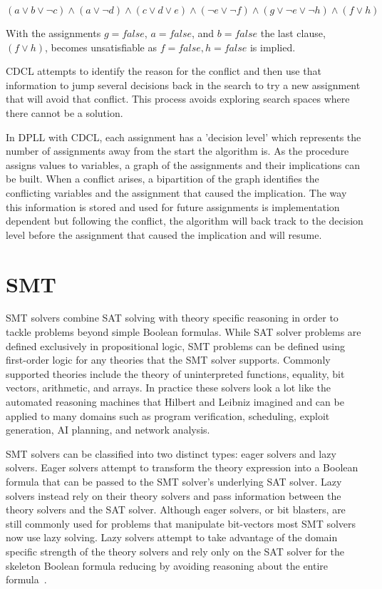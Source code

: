 \documentclass[]{final_report}
\begin{document}
$(a \lor b \lor \lnot c) \land (a \lor \lnot d) \land (c \lor d \lor e) \land (\lnot e \lor \lnot f ) \land (g \lor \lnot e \lor \lnot h) \land (f \lor h)$

With the assignments $g = \mathit{false}$, $a = \mathit{false}$, and $b = \mathit{false}$ the last clause, $ (f \lor h) $,  becomes unsatisfiable as $ f = \mathit{false}, h = \mathit{false}$ is implied.

CDCL attempts to identify the reason for the conflict and then use that information to jump several decisions back in the search to try a new assignment that will avoid that conflict. This process avoids exploring search spaces where there cannot be a solution. 

In DPLL with CDCL, each assignment has a 'decision level' which represents the number of assignments away from the start the algorithm is. As the procedure assigns values to variables, a graph of the assignments and their implications can be built. When a conflict arises, a bipartition of the graph identifies the conflicting variables and the assignment that caused the implication. The way this information is stored and used for future assignments is implementation dependent but following the conflict, the algorithm will back track to the decision level before the assignment that caused the implication and will resume.

\section{SMT}

SMT solvers combine SAT solving with theory specific reasoning in order to tackle problems beyond simple Boolean formulas. While SAT solver problems are defined exclusively in propositional logic, SMT problems can be defined using first-order logic for any theories that the SMT solver supports. Commonly supported theories include the theory of uninterpreted functions, equality, bit vectors,  arithmetic, and arrays. In practice these solvers look a lot like the automated reasoning machines that Hilbert and Leibniz imagined and can be applied to many domains such as program verification, scheduling, exploit generation, AI planning, and network analysis.

SMT solvers can be classified into two distinct types: eager solvers and lazy solvers. Eager solvers attempt to transform the theory expression into a Boolean formula that can be passed to the SMT solver's underlying SAT solver. Lazy solvers instead rely on their theory solvers and pass information between the theory solvers and the SAT solver. Although eager solvers, or bit blasters, are still commonly used for problems that manipulate bit-vectors most SMT solvers now use lazy solving. Lazy solvers attempt to take advantage of the domain specific strength of the theory solvers and rely only on the SAT solver for the skeleton Boolean formula reducing by avoiding reasoning about the entire formula~\cite{sattosmt, smtdpplt}.
\end{document}
